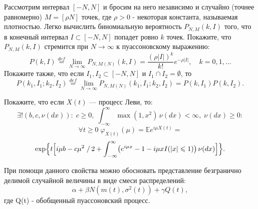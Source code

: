 \begin{problem}
Рассмотрим интервал 
$\left[ {-N,N} \right]$ и бросим на него независимо и случайно (точнее 
равномерно) $M=\left[ {\rho N} \right]$ точек, где $\rho >0$ - некоторая 
константа, называемая плотностью. Легко вычислить биномиальную вероятность 
$P_{N,M} \left( {k,I} \right)$ того, что в конечный интервал $I\subset 
\left[ {-N,N} \right]$ попадет ровно $k$ точек. Покажите, что $P_{N,M} 
\left( {k,I} \right)$ стремится при $N\to \infty $ к пуассоновскому 
выражению:
\[
P\left( {k,I} \right)\mathop =\limits^{def} \mathop {\lim }\limits_{N\to 
\infty } P_{N,M\left( N \right)} \left( {k,I} \right)=\frac{\left( {\rho 
\left| I \right|} \right)^k}{k!}e^{-\rho \left| I \right|},
\quad
k=0,1,...
\]
Покажите также, что если $I_1 ,I_2 \subset \left[ {-N,N} \right]$ и $I_1 
\cap I_2 =\emptyset $, то
\[
P\left( {k_1 ,I_1 ;k_2 ,I_2 } \right)\mathop =\limits^{def} \mathop {\lim 
}\limits_{N\to \infty } P_{N,M\left( N \right)} \left( {k_1 ,I_1 ;k_2 ,I_2 } 
\right)=P\left( {k,I_1 } \right)P\left( {k,I_2 } \right).
\]
\end{problem}




\begin{problem}
Покажите, что если $X(t)$ --- процесс Леви, то: 
$$
\exists ! (b,c,\nu(dx)): \; 
c\geqslant 0, \; \int_{-\infty}^{\infty} \max(1,x^2)\, \nu(dx)<\infty, \; \nu(dx)\geqslant 0 : 
$$
\[
\forall t\geqslant 0 \;  \varphi_{X(t)}(\mu)={\mathbb E}e^{i\mu X(t)}=  
\]
\[
\exp \Bigl\{ t\Bigl[ i\mu b-c\mu^2\left.\right/2+
\int_{-\infty}^{\infty} \bigl( e^{i\mu x}-1-i\mu x I(|x|\leqslant 1) \bigr)\, \nu(dx) 
\Bigr] \Bigr\} . 
\]

\end{problem}

\begin{remark}
При помощи данного свойства можно обосновать представление безгранично делимой случайной величины в виде смеси распределений: 
\[
\alpha + \beta N(m(t), \sigma^2(t)) + \gamma Q(t),
\]
\noindent где Q(t) - обобщенный пуассоновский процесс.
\end{remark}


